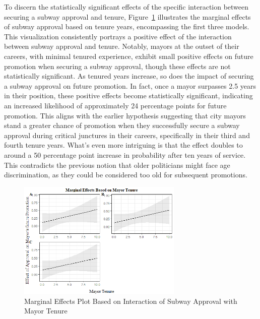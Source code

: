\documentclass[12pt, ]{article}
\begin{document}
To discern the statistically significant effects of the specific
interaction between securing a subway approval and tenure,
Figure~\ref{fig-tenuremarg} illustrates the marginal effects of subway
approval based on tenure years, encompassing the first three models.
This visualization consistently portrays a positive effect of the
interaction between subway approval and tenure. Notably, mayors at the
outset of their careers, with minimal tenured experience, exhibit small
positive effects on future promotion when securing a subway approval,
though these effects are not statistically significant. As tenured years
increase, so does the impact of securing a subway approval on future
promotion. In fact, once a mayor surpasses 2.5 years in their position,
these positive effects become statistically significant, indicating an
increased likelihood of approximately 24 percentage points for future
promotion. This aligns with the earlier hypothesis suggesting that city
mayors stand a greater chance of promotion when they successfully secure
a subway approval during critical junctures in their careers,
specifically in their third and fourth tenure years. What's even more
intriguing is that the effect doubles to around a 50 percentage point
increase in probability after ten years of service. This contradicts the
previous notion that older politicians might face age discrimination, as
they could be considered too old for subsequent promotions.

\begin{figure}[tbp]

{\centering \includegraphics[width=0.7\textwidth,height=\textheight]{figures/marginaleffect_tenure.png}

}

\caption{\label{fig-tenuremarg}Marginal Effects Plot Based on
Interaction of Subway Approval with Mayor Tenure}

\end{figure}
\end{document}
